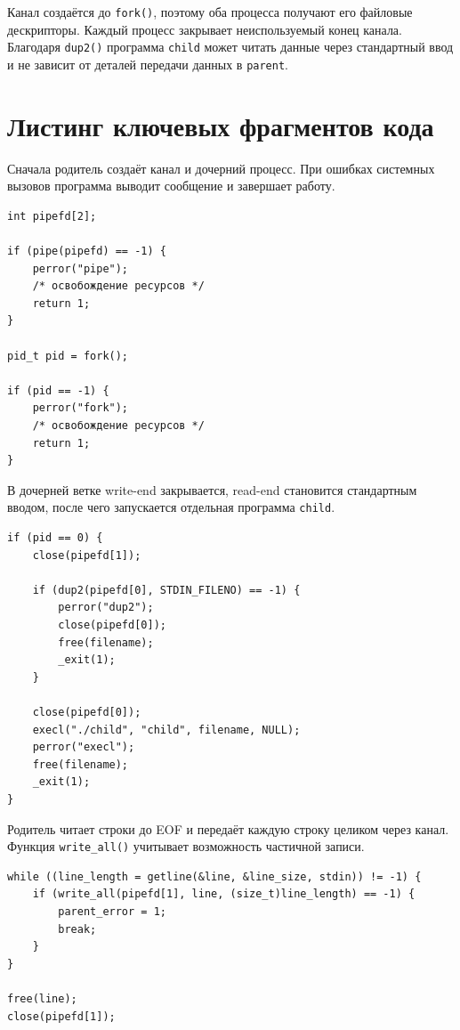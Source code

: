 \documentclass[12pt,a4paper]{article}
\begin{document}
Канал создаётся до \texttt{fork()}, поэтому оба процесса получают его файловые дескрипторы. Каждый процесс закрывает неиспользуемый конец канала. Благодаря \texttt{dup2()} программа \texttt{child} может читать данные через стандартный ввод и не зависит от деталей передачи данных в \texttt{parent}.

\section{Листинг ключевых фрагментов кода}

Сначала родитель создаёт канал и дочерний процесс. При ошибках системных вызовов программа выводит сообщение и завершает работу.

\begin{lstlisting}[style=cstyle,caption={Создание канала и дочернего процесса},label={lst:pipe-fork}]
int pipefd[2];

if (pipe(pipefd) == -1) {
    perror("pipe");
    /* освобождение ресурсов */
    return 1;
}

pid_t pid = fork();

if (pid == -1) {
    perror("fork");
    /* освобождение ресурсов */
    return 1;
}
\end{lstlisting}

В дочерней ветке write-end закрывается, read-end становится стандартным вводом, после чего запускается отдельная программа \texttt{child}.

\begin{lstlisting}[style=cstyle,caption={Перенаправление stdin и запуск программы child},label={lst:dup2-exec}]
if (pid == 0) {
    close(pipefd[1]);

    if (dup2(pipefd[0], STDIN_FILENO) == -1) {
        perror("dup2");
        close(pipefd[0]);
        free(filename);
        _exit(1);
    }

    close(pipefd[0]);
    execl("./child", "child", filename, NULL);
    perror("execl");
    free(filename);
    _exit(1);
}
\end{lstlisting}

Родитель читает строки до EOF и передаёт каждую строку целиком через канал. Функция \texttt{write\_all()} учитывает возможность частичной записи.

\begin{lstlisting}[style=cstyle,caption={Передача пользовательских строк через pipe},label={lst:parent-write}]
while ((line_length = getline(&line, &line_size, stdin)) != -1) {
    if (write_all(pipefd[1], line, (size_t)line_length) == -1) {
        parent_error = 1;
        break;
    }
}

free(line);
close(pipefd[1]);
\end{lstlisting}
\end{document}
